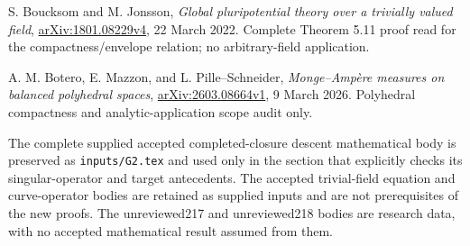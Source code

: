 \documentclass[
]{article}
\begin{document}
S. Boucksom and M. Jonsson, \emph{Global pluripotential theory over a
trivially valued field},
\href{https://arxiv.org/pdf/1801.08229v4}{arXiv:1801.08229v4}, 22 March
2022. Complete Theorem 5.11 proof read for the compactness/envelope
relation; no arbitrary-field application.

A. M. Botero, E. Mazzon, and L. Pille--Schneider, \emph{Monge--Ampère
measures on balanced polyhedral spaces},
\href{https://arxiv.org/pdf/2603.08664v1}{arXiv:2603.08664v1}, 9 March
2026. Polyhedral compactness and analytic-application scope audit only.

The complete supplied accepted completed-closure descent mathematical
body is preserved as \texttt{inputs/G2.tex} and used only in the section
that explicitly checks its singular-operator and target antecedents. The
accepted trivial-field equation and curve-operator bodies are retained
as supplied inputs and are not prerequisites of the new proofs. The
unreviewed217 and unreviewed218 bodies are research data, with no
accepted mathematical result assumed from them.
\end{document}
